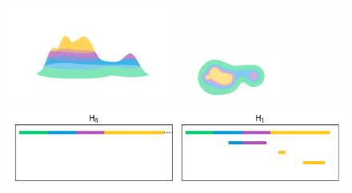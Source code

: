 
\begin{figure}[htbp]
  \centering
  \includegraphics[trim=200 200 200 200, clip, width=0.5\textwidth]{scripts/figures/surf/side.png}
  \includegraphics[trim=200 0 200 200, clip, width=0.3\textwidth]{scripts/figures/surf/top.png}
  \includegraphics[scale=0.75]{scripts/figures/scalar_barcode_true.png}
\end{figure}
